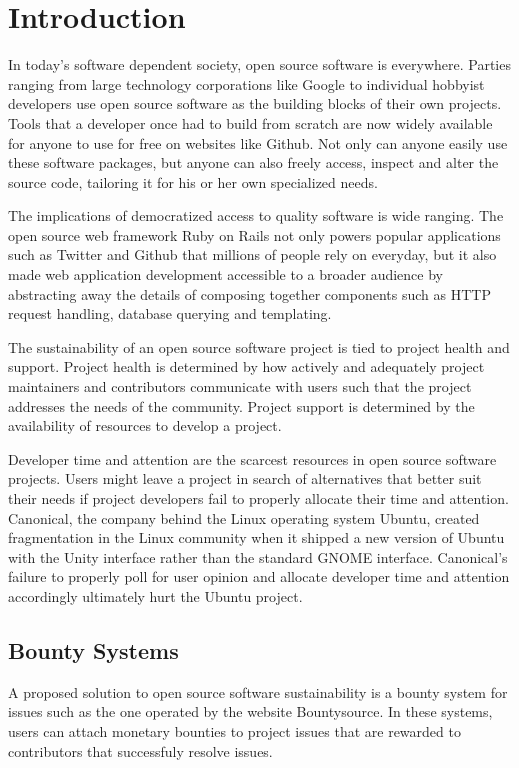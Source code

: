 \section{Introduction}

In today's software dependent society, open source software is everywhere.
Parties ranging from large technology corporations like Google to individual
hobbyist developers use open source software as the building blocks of their own
projects. Tools that a developer once had to build from scratch are now widely
available for anyone to use for free on websites like Github. Not only can
anyone easily use these software packages, but anyone can also freely access,
inspect and alter the source code, tailoring it for his or her own specialized needs.

The implications of democratized access to quality software is wide ranging. The
open source web framework Ruby on Rails not only powers popular applications
such as Twitter and Github that millions of people rely on everyday, but it also
made web application development accessible to a broader audience by abstracting
away the details of composing together components such as HTTP request handling,
database querying and templating.

The sustainability of an open source software project is tied to project health
and support. Project health is determined by how actively and adequately project
maintainers and contributors communicate with users such that the project
addresses the needs of the community. Project support is determined by the
availability of resources to develop a project\cite{successOSS}.

Developer time and attention are the scarcest resources in open source software
projects. Users might leave a project in search of alternatives that better suit
their needs if project developers fail to properly allocate their time and
attention. Canonical, the company behind the Linux operating system Ubuntu,
created fragmentation in the Linux community when it shipped a new version of
Ubuntu with the Unity interface rather than the standard GNOME
interface\cite{ubuntuUnity}. Canonical's failure to properly poll for user
opinion and allocate developer time and attention accordingly ultimately hurt
the Ubuntu project.

\subsection{Bounty Systems}

A proposed solution to open source software sustainability is a bounty system
for issues such as the one operated by the website
Bountysource\cite{bountysource}. In these systems, users can attach monetary
bounties to project issues that are rewarded to contributors that successfuly
resolve issues.

